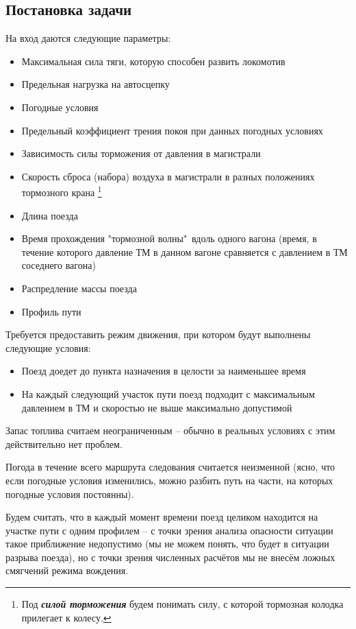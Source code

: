 \begin{itemize}
\subsection{Постановка задачи}
На вход даются следующие параметры:
\begin{itemize}
\item Максимальная сила тяги, которую способен развить локомотив
\item Предельная нагрузка на автосцепку
\item Погодные условия
\item Предельный коэффициент трения покоя при данных погодных условиях
\item Зависимость силы торможения от давления в магистрали
\item Скорость сброса (набора) воздуха в магистрали в разных положениях тормозного крана
\footnote{Под \textbf{\textit{силой торможения}} будем понимать силу, с которой тормозная колодка прилегает к колесу.}
\item Длина поезда
\item Время прохождения "тормозной волны"\ вдоль одного вагона (время, в течение которого давление ТМ в данном вагоне сравняется с давлением в ТМ соседнего вагона)
\item Распредление массы поезда
\item Профиль пути
\end{itemize}

Требуется предоставить режим движения, при котором будут выполнены следующие условия:
\begin{itemize}
\item Поезд доедет до пункта назначения в целости за наименьшее время
\item На каждый следующий участок пути поезд подходит с максимальным давлением в ТМ и скоростью не выше максимально допустимой
\end{itemize}


Запас топлива считаем неограниченным -- обычно в реальных условиях с этим действительно нет проблем.

Погода в течение всего маршрута следования считается неизменной (ясно, что если погодные условия изменились, можно разбить путь на части, на которых погодные условия постоянны).

Будем считать, что в каждый момент времени поезд целиком находится на участке пути с одним профилем -- с точки зрения анализа опасности ситуации такое приближение недопустимо (мы не можем понять, что будет в ситуации разрыва поезда), но с точки зрения численных расчётов мы не внесём ложных смягчений режима вождения.


\end{itemize}
